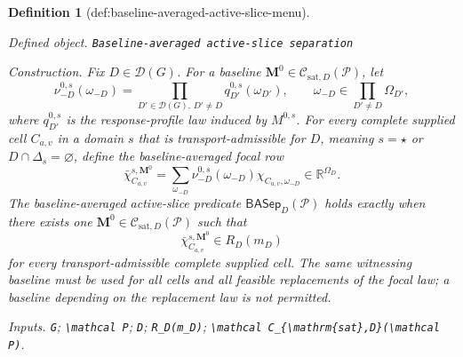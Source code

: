 \documentclass{article}
\newtheorem{definition}{Definition}
\begin{document}
\begin{definition}[def:baseline-averaged-active-slice-menu]\label{def:baseline-averaged-active-slice-menu}
\par\smallskip\noindent\emph{Defined object.} \texttt{Baseline-\allowbreak{}averaged active-\allowbreak{}slice separation}
\par\smallskip\noindent\emph{Construction.} Fix \(D\in\mathcal D(G)\).  For a baseline \(\mathbf M^0\in\mathcal C_{\mathrm{sat},D}(\mathcal P)\), let
\[
\nu_{-D}^{0,s}(\omega_{-D})
=\prod_{D'\in\mathcal D(G),\,D'\ne D}q_{D'}^{0,s}(\omega_{D'}),
\qquad
\omega_{-D}\in\prod_{D'\ne D}\Omega_{D'},
\]
where \(q_{D'}^{0,s}\) is the response-profile law induced by \(M^{0,s}\).  For every complete supplied cell \(C_{a,v}\) in a domain \(s\) that is transport-admissible for \(D\), meaning \(s=\star\) or \(D\cap\Delta_s=\varnothing\), define the baseline-averaged focal row
\[
\bar\chi_{C_{a,v}}^{s,\mathbf M^0}
=\sum_{\omega_{-D}}
\nu_{-D}^{0,s}(\omega_{-D})
\chi_{C_{a,v},\omega_{-D}}
\in\mathbb R^{\Omega_D}.
\]
The baseline-averaged active-slice predicate \(\mathsf{BASep}_D(\mathcal P)\) holds exactly when there exists one \(\mathbf M^0\in\mathcal C_{\mathrm{sat},D}(\mathcal P)\) such that
\[
\bar\chi_{C_{a,v}}^{s,\mathbf M^0}\in R_D(m_D)
\]
for every transport-admissible complete supplied cell.  The same witnessing baseline must be used for all cells and all feasible replacements of the focal law; a baseline depending on the replacement law is not permitted.
\par\smallskip\noindent\emph{Inputs.} \texttt{G}; \texttt{\textbackslash{}\allowbreak{}mathcal P}; \texttt{D}; \texttt{R\_\allowbreak{}D(m\_\allowbreak{}D)}; \texttt{\textbackslash{}\allowbreak{}mathcal C\_\allowbreak{}\{\textbackslash{}\allowbreak{}mathrm\{sat\}\allowbreak{},\allowbreak{}D\}\allowbreak{}(\textbackslash{}\allowbreak{}mathcal P)}.
\end{definition}
\end{document}
